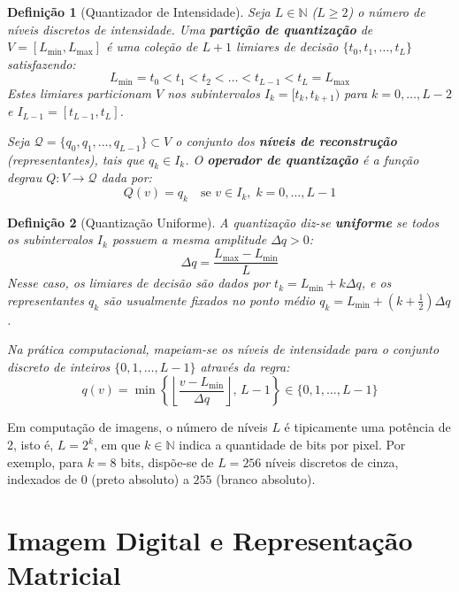 \documentclass[a4paper,12pt]{report}
\newtheorem{Defini}{\bf Definição}
\begin{document}
\begin{Defini}[Quantizador de Intensidade]
Seja $L \in \mathbb{N}$ ($L \ge 2$) o número de níveis discretos de intensidade. Uma \textbf{partição de quantização} de $V = [L_{\min}, L_{\max}]$ é uma coleção de $L+1$ limiares de decisão $\{t_0, t_1, \dots, t_L\}$ satisfazendo:
\begin{equation}
L_{\min} = t_0 < t_1 < t_2 < \dots < t_{L-1} < t_L = L_{\max}
\end{equation}
Estes limiares particionam $V$ nos subintervalos $I_k = [t_k, t_{k+1})$ para $k = 0, \dots, L-2$ e $I_{L-1} = [t_{L-1}, t_L]$.

Seja $\mathcal{Q} = \{q_0, q_1, \dots, q_{L-1}\} \subset V$ o conjunto dos \textbf{níveis de reconstrução} (representantes), tais que $q_k \in I_k$. O \textbf{operador de quantização} é a função degrau $Q: V \to \mathcal{Q}$ dada por:
\begin{equation}
Q(v) = q_k \quad \text{se } v \in I_k, \; k = 0, \dots, L-1
\end{equation}
\end{Defini}

\begin{Defini}[Quantização Uniforme]
A quantização diz-se \textbf{uniforme} se todos os subintervalos $I_k$ possuem a mesma amplitude $\Delta q > 0$:
\begin{equation}
\Delta q = \frac{L_{\max} - L_{\min}}{L}
\end{equation}
Nesse caso, os limiares de decisão são dados por $t_k = L_{\min} + k \Delta q$, e os representantes $q_k$ são usualmente fixados no ponto médio $q_k = L_{\min} + \left(k + \frac{1}{2}\right)\Delta q$.

Na prática computacional, mapeiam-se os níveis de intensidade para o conjunto discreto de inteiros $\{0, 1, \dots, L-1\}$ através da regra:
\begin{equation}
q(v) = \min \left\{ \left\lfloor \frac{v - L_{\min}}{\Delta q} \right\rfloor, \, L - 1 \right\} \in \{0, 1, \dots, L-1\}
\end{equation}
\end{Defini}

Em computação de imagens, o número de níveis $L$ é tipicamente uma potência de 2, isto é, $L = 2^k$, em que $k \in \mathbb{N}$ indica a quantidade de bits por pixel. Por exemplo, para $k=8$ bits, dispõe-se de $L = 256$ níveis discretos de cinza, indexados de $0$ (preto absoluto) a $255$ (branco absoluto).

\section{Imagem Digital e Representação Matricial}
\end{document}
